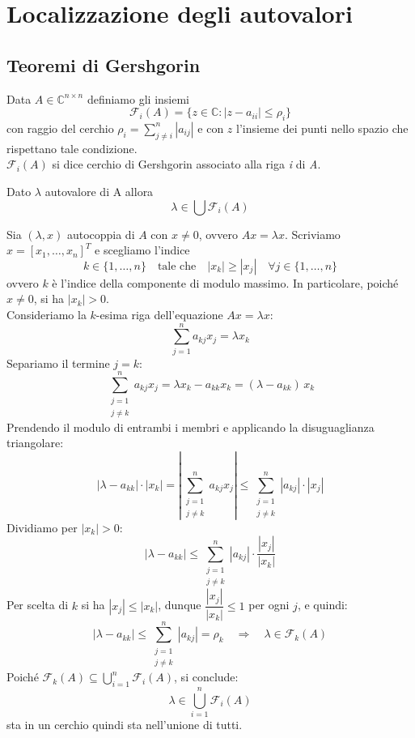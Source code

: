 \documentclass[12pt,a4paper,]{report}
\begin{document}
\section{Localizzazione degli autovalori}

\subsection{Teoremi di Gershgorin}
\begin{definizione}
Data $A\in \mathbb{C}^{n\times n}$ definiamo gli insiemi
\[
\mathcal{F}_i(A) = \{z \in \mathbb{C} : |z - a_{ii}| \leq \rho_i \}
\]
con raggio del cerchio $\rho_i = \sum^n_{j\neq i}|a_{ij}|$ e con $z$ l'insieme dei punti nello spazio che rispettano tale condizione.\\
$\mathcal{F}_i(A)$ si dice cerchio di Gershgorin associato alla riga \textit{i} di \textit{A}.
\end{definizione}
\begin{teorema}
    Dato $\lambda$ autovalore di A allora \[\lambda \in \bigcup  \mathcal{F}_i(A)\]
\end{teorema}

\begin{dimostrazione}
    Sia $(\lambda, x)$ autocoppia di $A$ con $x \neq 0$, ovvero $Ax = \lambda x$.
    Scriviamo $x = [x_1, \dots, x_n]^T$ e scegliamo l'indice
    \[
        k \in \{1, \dots, n\} \quad \text{tale che} \quad
        |x_k| \geq |x_j| \quad \forall j \in \{1, \dots, n\}
    \]
    ovvero $k$ è l'indice della componente di modulo massimo. In particolare,
    poiché $x \neq 0$, si ha $|x_k| > 0$.
    \\
    Consideriamo la $k$-esima riga dell'equazione $Ax = \lambda x$:
    \[
        \sum_{j=1}^{n} a_{kj} x_j = \lambda x_k
    \]
    Separiamo il termine $j = k$:
    \[
        \sum_{\substack{j=1 \\ j \neq k}}^{n} a_{kj} x_j = \lambda x_k - a_{kk} x_k
        = (\lambda - a_{kk})\, x_k
    \]
    Prendendo il modulo di entrambi i membri e applicando la disuguaglianza triangolare:
    \[
        |\lambda - a_{kk}| \cdot |x_k|
        = \left| \sum_{\substack{j=1 \\ j \neq k}}^{n} a_{kj} x_j \right|
        \leq \sum_{\substack{j=1 \\ j \neq k}}^{n} |a_{kj}| \cdot |x_j|
    \]
    Dividiamo per $|x_k| > 0$:
    \[
        |\lambda - a_{kk}|
        \leq \sum_{\substack{j=1 \\ j \neq k}}^{n} |a_{kj}| \cdot \frac{|x_j|}{|x_k|}
    \]
    Per scelta di $k$ si ha $|x_j| \leq |x_k|$, dunque $\dfrac{|x_j|}{|x_k|} \leq 1$ per ogni $j$, e quindi:
    \[
        |\lambda - a_{kk}|
        \leq \sum_{\substack{j=1 \\ j \neq k}}^{n} |a_{kj}|
        = \rho_k
        \quad \Longrightarrow \quad \lambda \in \mathcal{F}_k(A)
    \]
    Poiché $\mathcal{F}_k(A) \subseteq \displaystyle\bigcup_{i=1}^{n} \mathcal{F}_i(A)$, si conclude:
    \[
        \lambda \in \bigcup_{i=1}^{n} \mathcal{F}_i(A)
    \]
    sta in un cerchio quindi sta nell'unione di tutti.
\end{dimostrazione}
\end{document}
